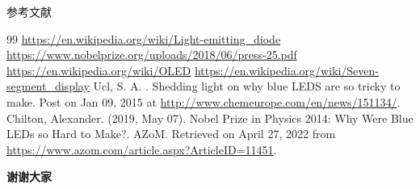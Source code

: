 \documentclass{beamer}
\begin{document}
\begin{frame}[plain]{参考文献}
\begin{thebibliography}{99}\setlength{\itemsep}{0pt}\small
     \url{https://en.wikipedia.org/wiki/Light-emitting_diode}
    \url{https://www.nobelprize.org/uploads/2018/06/press-25.pdf}
    \url{https://en.wikipedia.org/wiki/OLED}
    \url{https://en.wikipedia.org/wiki/Seven-segment_display}
     Ucl, S. A. . Shedding light on why blue LEDS are so tricky to make. Post on Jan 09, 2015 at \url{http://www.chemeurope.com/en/news/151134/}.
     Chilton, Alexander. (2019, May 07). Nobel Prize in Physics 2014: Why Were Blue LEDs so Hard to Make?. AZoM. Retrieved on April 27, 2022 from \url{https://www.azom.com/article.aspx?ArticleID=11451}.
\end{thebibliography}
\end{frame}

\begin{frame}[plain]
    \begin{center}
        \Huge\textbf{谢谢大家}
    \end{center}
\end{frame}
\end{document}
